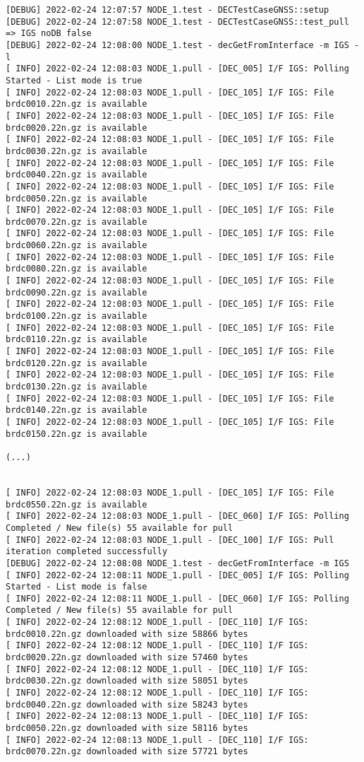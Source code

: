 \documentclass[dec_sum_main.tex]{subfiles}
\begin{document}
 \newline

\begin{Verbatim}[fontsize=\tiny]
[DEBUG] 2022-02-24 12:07:57 NODE_1.test - DECTestCaseGNSS::setup
[DEBUG] 2022-02-24 12:07:58 NODE_1.test - DECTestCaseGNSS::test_pull => IGS noDB false
[DEBUG] 2022-02-24 12:08:00 NODE_1.test - decGetFromInterface -m IGS -l
[ INFO] 2022-02-24 12:08:03 NODE_1.pull - [DEC_005] I/F IGS: Polling Started - List mode is true
[ INFO] 2022-02-24 12:08:03 NODE_1.pull - [DEC_105] I/F IGS: File brdc0010.22n.gz is available
[ INFO] 2022-02-24 12:08:03 NODE_1.pull - [DEC_105] I/F IGS: File brdc0020.22n.gz is available
[ INFO] 2022-02-24 12:08:03 NODE_1.pull - [DEC_105] I/F IGS: File brdc0030.22n.gz is available
[ INFO] 2022-02-24 12:08:03 NODE_1.pull - [DEC_105] I/F IGS: File brdc0040.22n.gz is available
[ INFO] 2022-02-24 12:08:03 NODE_1.pull - [DEC_105] I/F IGS: File brdc0050.22n.gz is available
[ INFO] 2022-02-24 12:08:03 NODE_1.pull - [DEC_105] I/F IGS: File brdc0070.22n.gz is available
[ INFO] 2022-02-24 12:08:03 NODE_1.pull - [DEC_105] I/F IGS: File brdc0060.22n.gz is available
[ INFO] 2022-02-24 12:08:03 NODE_1.pull - [DEC_105] I/F IGS: File brdc0080.22n.gz is available
[ INFO] 2022-02-24 12:08:03 NODE_1.pull - [DEC_105] I/F IGS: File brdc0090.22n.gz is available
[ INFO] 2022-02-24 12:08:03 NODE_1.pull - [DEC_105] I/F IGS: File brdc0100.22n.gz is available
[ INFO] 2022-02-24 12:08:03 NODE_1.pull - [DEC_105] I/F IGS: File brdc0110.22n.gz is available
[ INFO] 2022-02-24 12:08:03 NODE_1.pull - [DEC_105] I/F IGS: File brdc0120.22n.gz is available
[ INFO] 2022-02-24 12:08:03 NODE_1.pull - [DEC_105] I/F IGS: File brdc0130.22n.gz is available
[ INFO] 2022-02-24 12:08:03 NODE_1.pull - [DEC_105] I/F IGS: File brdc0140.22n.gz is available
[ INFO] 2022-02-24 12:08:03 NODE_1.pull - [DEC_105] I/F IGS: File brdc0150.22n.gz is available

(...)


[ INFO] 2022-02-24 12:08:03 NODE_1.pull - [DEC_105] I/F IGS: File brdc0550.22n.gz is available
[ INFO] 2022-02-24 12:08:03 NODE_1.pull - [DEC_060] I/F IGS: Polling Completed / New file(s) 55 available for pull
[ INFO] 2022-02-24 12:08:03 NODE_1.pull - [DEC_100] I/F IGS: Pull iteration completed successfully
[DEBUG] 2022-02-24 12:08:08 NODE_1.test - decGetFromInterface -m IGS
[ INFO] 2022-02-24 12:08:11 NODE_1.pull - [DEC_005] I/F IGS: Polling Started - List mode is false
[ INFO] 2022-02-24 12:08:11 NODE_1.pull - [DEC_060] I/F IGS: Polling Completed / New file(s) 55 available for pull
[ INFO] 2022-02-24 12:08:12 NODE_1.pull - [DEC_110] I/F IGS: brdc0010.22n.gz downloaded with size 58866 bytes
[ INFO] 2022-02-24 12:08:12 NODE_1.pull - [DEC_110] I/F IGS: brdc0020.22n.gz downloaded with size 57460 bytes
[ INFO] 2022-02-24 12:08:12 NODE_1.pull - [DEC_110] I/F IGS: brdc0030.22n.gz downloaded with size 58051 bytes
[ INFO] 2022-02-24 12:08:12 NODE_1.pull - [DEC_110] I/F IGS: brdc0040.22n.gz downloaded with size 58243 bytes
[ INFO] 2022-02-24 12:08:13 NODE_1.pull - [DEC_110] I/F IGS: brdc0050.22n.gz downloaded with size 58116 bytes
[ INFO] 2022-02-24 12:08:13 NODE_1.pull - [DEC_110] I/F IGS: brdc0070.22n.gz downloaded with size 57721 bytes


\end{Verbatim}
\end{document}
